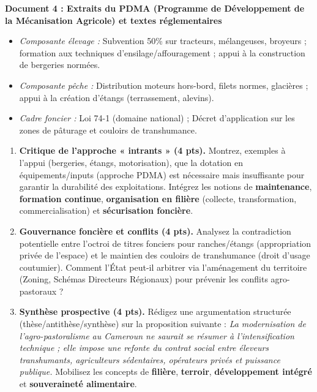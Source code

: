 \documentclass[11pt]{article}
\begin{document}
\begin{exercice}
\textbf{Document 4 : Extraits du PDMA (Programme de Développement de la Mécanisation Agricole) et textes réglementaires}

\begin{itemize}
    \item \textit{Composante élevage :} Subvention 50\% sur tracteurs, mélangeuses, broyeurs ; formation aux techniques d'ensilage/affouragement ; appui à la construction de bergeries normées.
    \item \textit{Composante pêche :} Distribution moteurs hors-bord, filets normes, glacières ; appui à la création d'étangs (terrassement, alevins).
    \item \textit{Cadre foncier :} Loi 74-1 (domaine national) ; Décret d'application sur les zones de pâturage et couloirs de transhumance.
\end{itemize}

\begin{enumerate}
    \item \textbf{Critique de l'approche « intrants » (4 pts).} Montrez, exemples à l'appui (bergeries, étangs, motorisation), que la dotation en équipements/inputs (approche PDMA) est nécessaire mais insuffisante pour garantir la durabilité des exploitations. Intégrez les notions de \textbf{maintenance}, \textbf{formation continue}, \textbf{organisation en filière} (collecte, transformation, commercialisation) et \textbf{sécurisation foncière}.
    \item \textbf{Gouvernance foncière et conflits (4 pts).} Analysez la contradiction potentielle entre l'octroi de titres fonciers pour ranches/étangs (appropriation privée de l'espace) et le maintien des couloirs de transhumance (droit d'usage coutumier). Comment l'État peut-il arbitrer via l'aménagement du territoire (Zoning, Schémas Directeurs Régionaux) pour prévenir les conflits agro-pastoraux ?
    \item \textbf{Synthèse prospective (4 pts).} Rédigez une argumentation structurée (thèse/antithèse/synthèse) sur la proposition suivante : \og \textit{La modernisation de l'agro-pastoralisme au Cameroun ne saurait se résumer à l'intensification technique ; elle impose une refonte du contrat social entre éleveurs transhumants, agriculteurs sédentaires, opérateurs privés et puissance publique.} \fg Mobilisez les concepts de \textbf{filière}, \textbf{terroir}, \textbf{développement intégré} et \textbf{souveraineté alimentaire}.
\end{enumerate}
\end{exercice}
\end{document}
